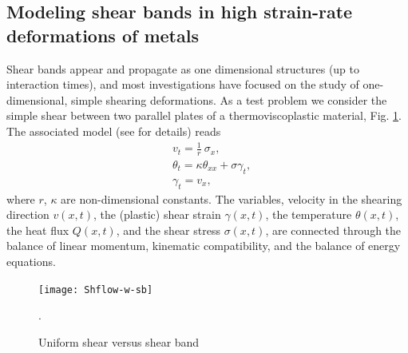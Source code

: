 \documentclass[a4paper,11pt]{article}
\theoremstyle{remark}
\begin{document}
\subsection{Modeling shear bands in high strain-rate deformations of metals}
Shear bands appear and propagate as one dimensional structures (up to interaction times), and
most investigations have focused on the study of one-dimensional, simple shearing deformations.
As a test problem we consider the simple shear between two parallel plates of a
thermoviscoplastic material,  Fig. \ref{ShearFlow}. The associated model
(see \cite{CDHS,WW,KT} for details) reads
\begin{equation}
  \label{sbeq}
  \begin{aligned}
    & v_{t} = \frac{1}{r}\ \sigma_{x},\\
    & \theta_{t} = \kappa \theta_{ x x}  +  \sigma \gamma_{t}, \\
    & \gamma_{t} = v_{x},
  \end{aligned}
\end{equation}
where $r$, $\kappa$ are non-dimensional constants. The variables,
velocity in the shearing direction $v(x,t)$,
the (plastic) shear strain $\gamma (x,t)$, the temperature $\theta(x,t)$, the heat flux $Q(x,t)$, and the
shear stress $\sigma(x,t)$, are connected through the balance of linear momentum,
kinematic compatibility, and the balance of energy equations.


\begin{figure}
\centering
\vspace{-0.1cm}
\texttt{[image: Shflow-w-sb]}
\vspace{0.1cm}
\caption{Uniform shear versus shear band}.
\label{ShearFlow}
\end{figure}
\end{document}
